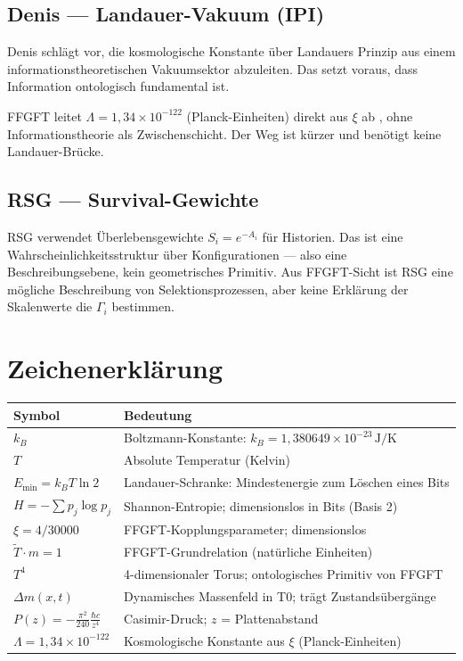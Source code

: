\subsection{Denis — Landauer-Vakuum (IPI)}

Denis \cite{Denis2023} schlägt vor, die kosmologische Konstante über
Landauers Prinzip aus einem informationstheoretischen Vakuumsektor
abzuleiten. Das setzt voraus, dass Information ontologisch fundamental ist.

FFGFT leitet $\Lambda = 1{,}34 \times 10^{-122}$ (Planck-Einheiten)
direkt aus $\xi$ ab \cite{Pascher_182}, ohne Informationstheorie als
Zwischenschicht. Der Weg ist kürzer und benötigt keine Landauer-Brücke.

\subsection{RSG — Survival-Gewichte}

RSG \cite{Austin2026} verwendet Überlebensgewichte $S_i = e^{-A_i}$ für
Historien. Das ist eine Wahrscheinlichkeitsstruktur über Konfigurationen —
also eine Beschreibungsebene, kein geometrisches Primitiv. Aus FFGFT-Sicht
ist RSG eine mögliche Beschreibung von Selektionsprozessen, aber keine
Erklärung der Skalenwerte die $\Gamma_i$ bestimmen.

\section{Zeichenerklärung}

{\small
\begin{tabular}{p{3.5cm}p{9.5cm}}
\toprule
\textbf{Symbol} & \textbf{Bedeutung} \\
\midrule
$k_B$ & Boltzmann-Konstante: $k_B = 1{,}380649 \times 10^{-23}\,\text{J/K}$ \\
$T$ & Absolute Temperatur (Kelvin) \\
$E_{\min} = k_B T \ln 2$ & Landauer-Schranke: Mindestenergie zum Löschen eines Bits \\
$H = -\sum p_j \log p_j$ & Shannon-Entropie; dimensionslos in Bits (Basis 2) \cite{Shannon1948} \\
$\xi = 4/30000$ & FFGFT-Kopplungsparameter; dimensionslos \\
$\tilde{T} \cdot m = 1$ & FFGFT-Grundrelation (natürliche Einheiten) \\
$T^4$ & 4-dimensionaler Torus; ontologisches Primitiv von FFGFT \\
$\Delta m(x,t)$ & Dynamisches Massenfeld in T0; trägt Zustandsübergänge \\
$P(z) = -\frac{\pi^2}{240}\frac{\hbar c}{z^4}$ & Casimir-Druck; $z$ = Plattenabstand \cite{Casimir1948} \\
$\Lambda = 1{,}34 \times 10^{-122}$ & Kosmologische Konstante aus $\xi$ (Planck-Einheiten) \cite{Pascher_182} \\
\bottomrule
\end{tabular}
}

